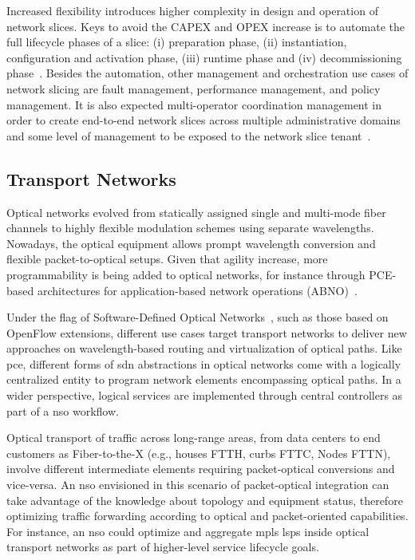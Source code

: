 Increased flexibility introduces higher complexity in design and operation of network slices. Keys to avoid the CAPEX and OPEX increase is to automate the full lifecycle phases of a slice: (i) preparation phase, (ii) instantiation, configuration and activation phase, (iii) runtime phase and (iv) decommissioning phase~\cite{3GPP:TR28801:2017}. Besides the automation, other management and orchestration use cases of network slicing are fault management, performance management, and policy management. It is also expected multi-operator coordination management in order to create end-to-end network slices across multiple administrative domains and some level of management to be exposed to the network slice tenant~\cite{Contreras:2018}.

\subsection{Transport Networks}
Optical networks evolved from statically assigned single and multi-mode fiber channels to highly flexible modulation schemes using separate wavelengths. Nowadays, the optical equipment allows prompt wavelength conversion and flexible packet-to-optical setups. Given that agility increase, more programmability is being added to optical networks, for instance through PCE-based architectures for application-based network operations (ABNO)~\cite{RFC7491}. 

Under the flag of Software-Defined Optical Networks~\cite{7503119}, such as those based on OpenFlow extensions, different use cases target transport networks to deliver new approaches on wavelength-based routing and virtualization of optical paths.  Like \gls{pce}, different forms of \gls{sdn} abstractions in optical networks come with a logically centralized entity to program network elements encompassing optical paths. In a wider perspective, logical services are implemented through central controllers as part of a \gls{nso} workflow.
 
Optical transport of traffic across long-range areas, from data centers to end customers as Fiber-to-the-X (e.g., houses FTTH, curbs FTTC, Nodes FTTN), involve different intermediate elements requiring packet-optical conversions and vice-versa. An \gls{nso} envisioned in this scenario of packet-optical integration can take advantage of the knowledge about topology and equipment status, therefore optimizing traffic forwarding according to optical and packet-oriented capabilities. For instance, an \gls{nso} could optimize and aggregate \gls{mpls} \glspl{lsp} inside optical transport networks as part of higher-level service lifecycle goals.

